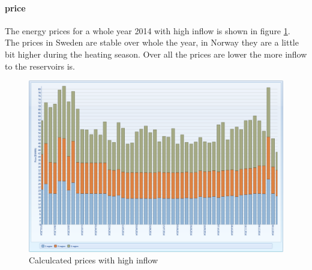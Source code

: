 \documentclass{article}
\begin{document}
\paragraph{price\\}
The energy prices for a whole year 2014 with high inflow is shown in figure \ref{fig:MTpriceswet}. The prices in Sweden are stable over whole the year, in Norway they are a little bit higher during the heating season. Over all the prices are lower the more inflow to the reservoirs is.
\begin{figure}[htbp]
\begin{center}
\includegraphics[width=13cm,keepaspectratio=true]{figures/wetcase/MTpriceswet}
\caption{Calculcated prices with high inflow}
\label{fig:MTpriceswet}
\end{center}
\end{figure}

\end{document}
